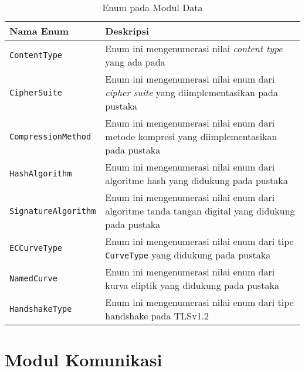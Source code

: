 \begin{table}[!h]
  \centering
  \caption{Enum pada Modul Data} \label{tab:impl.enum}
  \begin{tabular}{|p{3.75cm}|p{9cm}|}
    \hline
    \textbf{Nama Enum} & \textbf{Deskripsi} \\ \hline
    \texttt{ContentType} & Enum ini mengenumerasi nilai \emph{content type} yang ada pada \textcite{rfc5246} \\ \hline
    \texttt{CipherSuite} & Enum ini mengenumerasi nilai enum dari \emph{cipher suite} yang diimplementasikan pada pustaka \\ \hline
    \texttt{CompressionMethod} & Enum ini mengenumerasi nilai enum dari metode kompresi yang diimplementasikan pada pustaka \\ \hline
    \texttt{HashAlgorithm} & Enum ini mengenumerasi nilai enum dari algoritme hash yang didukung pada pustaka \\ \hline
    \texttt{SignatureAlgorithm} & Enum ini mengenumerasi nilai enum dari algoritme tanda tangan digital yang didukung pada pustaka \\ \hline
    \texttt{ECCurveType} & Enum ini mengenumerasi nilai enum dari tipe \texttt{CurveType} yang didukung pada pustaka\\ \hline
    \texttt{NamedCurve} & Enum ini mengenumerasi nilai enum dari kurva eliptik yang didukung pada pustaka\\ \hline
    \texttt{HandshakeType} & Enum ini mengenumerasi nilai enum dari tipe handshake pada TLSv1.2\\ \hline
  \end{tabular}
\end{table}

\section{Modul Komunikasi}


